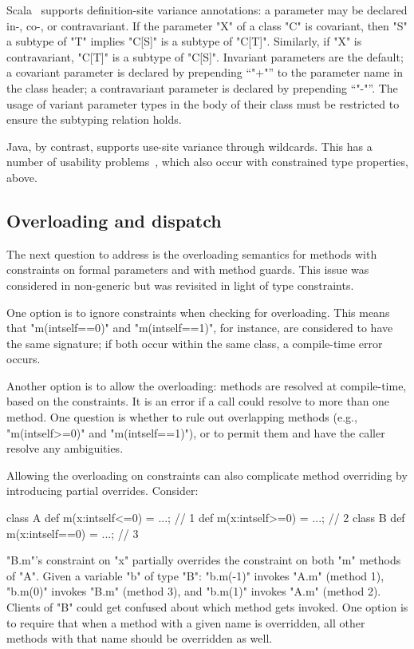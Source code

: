 Scala~\cite{scala} supports definition-site variance
annotations:
a parameter may be declared in-, co-, or
contravariant.
If the parameter \xcd"X" of a class \xcd"C" is covariant,
then \xcd"S" a subtype of
\xcd"T" implies  \xcd"C[S]" is a subtype of \xcd"C[T]".
Similarly, if \xcd"X" is contravariant,
\xcd"C[T]" is a subtype of \xcd"C[S]".
Invariant parameters are the default; a covariant parameter is
declared by prepending ``\xcd"+"'' to the parameter name in the
class header; a contravariant parameter is declared by
prepending ``\xcd"-"''.  The usage of variant parameter types in
the body of their class must be
restricted to ensure the subtyping relation holds.

Java, by contrast, supports use-site variance through wildcards.
This has a number of usability problems~\cite{wildcards-are-evil},
which also occur with constrained type properties, above.

\subsection{Overloading and dispatch}

The next question to address is the overloading semantics for
methods with constraints on formal parameters and with method
guards.  This issue was considered in non-generic \Xten but was
revisited in light of type constraints.

One option is to ignore constraints when checking for
overloading.  This means that \xcd"m(int{self==0})" and
\xcd"m(int{self==1})", for instance, are considered to have the
same signature; if both occur within the same class, a
compile-time error occurs.

Another option is to allow the
overloading: methods are resolved at compile-time, based on the
constraints.  It is an error if a call could resolve to more
than one method.  One question is whether to rule out overlapping
methods (e.g., \xcd"m(int{self>=0})" and \xcd"m(int{self==1})"),
or to permit them and have the caller resolve any
ambiguities.


Allowing the overloading on constraints can also complicate method
overriding by introducing partial overrides.
Consider:
\begin{xtennoindent}
  class A {
    def m(x:int{self<=0}) = ...; // 1
    def m(x:int{self>=0}) = ...; // 2
  }
  class B {
    def m(x:int{self==0}) = ...; // 3
  }
\end{xtennoindent}
\noindent
\xcd"B.m"'s constraint on \xcd"x" partially overrides the
constraint on both \xcd"m" methods of \xcd"A".  Given a variable
\xcd"b" of type \xcd"B": \xcd"b.m(-1)" invokes \xcd"A.m" (method 1),
\xcd"b.m(0)" invokes \xcd"B.m" (method 3), and \xcd"b.m(1)"
invokes \xcd"A.m" (method 2).  Clients of \xcd"B" could get
confused about which method gets invoked.  One option is to
require that when a method with a given name is overridden, all
other methods with that name should be overridden as well.

